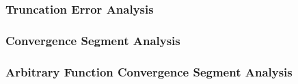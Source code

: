 \documentclass[10pt]{article}
\begin{document}
        \subsubsection{Truncation Error Analysis} \label{appendix:q3:source:trunc_error}
            
        
        \subsubsection{Convergence Segment Analysis} \label{appendix:q3:source:convergence_analysis}
            

        \subsubsection{Arbitrary Function Convergence Segment Analysis} \label{appendix:q3:source:arb_convergence_analysis}
            

\end{document}
